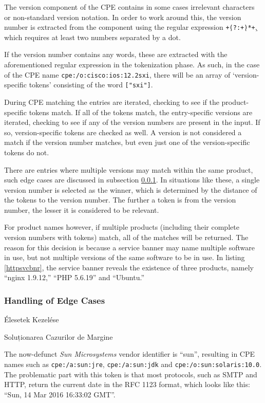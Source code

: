 \documentclass[a4paper,12pt]{article}
\newcommand\subsubsectionhu[1]{\addcontentsline{toc.hu}{subsubsection} {\protect\numberline{\thesubsubsection} #1}}
\newcommand\subsubsectionro[1]{\addcontentsline{toc.ro}{subsubsection} {\protect\numberline{\thesubsubsection} #1}}
\begin{document}
	The version component of the CPE contains in some cases irrelevant characters or non-standard version notation. In order to work around this, the version number is extracted from the component using the regular expression \texttt{\d+\.(?:\d+\.)*\d+}, which requires at least two numbers separated by a dot.
	
	If the version number contains any words, these are extracted with the aforementioned regular expression in the tokenization phase. As such, in the case of the CPE name \texttt{cpe:/o:cisco:ios:12.2sxi}, there will be an array of `version-specific tokens' consisting of the word \texttt{["sxi"]}.
	
	During CPE matching the entries are iterated, checking to see if the product-specific tokens match. If all of the tokens match, the entry-specific versions are iterated, checking to see if any of the version numbers are present in the input. If so, version-specific tokens are checked as well. A version is not considered a match if the version number matches, but even just one of the version-specific tokens do not.
	
	There are entries where multiple versions may match within the same product, such edge cases are discussed in subsection \ref{ssec:cpeedges}. In situations like these, a single version number is selected as the winner, which is determined by the distance of the tokens to the version number. The further a token is from the version number, the lesser it is considered to be relevant.
	
	For product names however, if multiple products (including their complete version numbers with tokens) match, all of the matches will be returned. The reason for this decision is because a service banner may name multiple software in use, but not multiple versions of the same software to be in use. In listing \ref{httpsvcbnr}, the service banner reveals the existence of three products, namely ``nginx 1.9.12,'' ``PHP 5.6.19'' and ``Ubuntu.''
	
\subsubsection{Handling of Edge Cases} \label{ssec:cpeedges}
\subsubsectionhu{Élesetek Kezelése} \subsubsectionro{Soluționarea Cazurilor de Margine}

	The now-defunct \textit{Sun Microsystems} vendor identifier is ``sun'', resulting in CPE names such as \texttt{cpe:/a:sun:jre}, \texttt{cpe:/a:sun:jdk} and \texttt{cpe:/o:sun:solaris:10.0}. The problematic part with this token is that most protocols, such as SMTP and HTTP, return the current date in the RFC 1123 format\cite{rfc2616}, which looks like this: ``Sun, 14 Mar 2016 16:33:02 GMT''.
	
\end{document}
